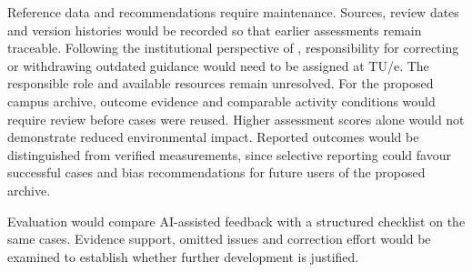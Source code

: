 \documentclass[11pt,a4paper]{article}
\begin{document}
Reference data and recommendations require maintenance. Sources, review dates and version histories would be recorded so that earlier assessments remain traceable. Following the institutional perspective of \citet{hasselbalch2025sustainability}, responsibility for correcting or withdrawing outdated guidance would need to be assigned at TU/e. The responsible role and available resources remain unresolved. For the proposed campus archive, outcome evidence and comparable activity conditions would require review before cases were reused. Higher assessment scores alone would not demonstrate reduced environmental impact. Reported outcomes would be distinguished from verified measurements, since selective reporting could favour successful cases and bias recommendations for future users of the proposed archive.

Evaluation would compare AI-assisted feedback with a structured checklist on the same cases. Evidence support, omitted issues and correction effort would be examined to establish whether further development is justified.
\end{document}
